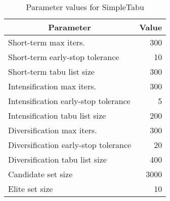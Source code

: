\begin{table}[htp]
\centering
\begin{tabular}{|l|r|}
    \hline
    \multicolumn{1}{|c|}{\textbf{Parameter}} & \multicolumn{1}{c|}{\textbf{Value}} \\ \hline
    Short-term max iters. & 300 \\ \hline
    Short-term early-stop tolerance & 10 \\ \hline
    Short-term tabu list size & 300 \\ \hline
    Intensification max iters. & 300 \\ \hline
    Intensification early-stop tolerance & 5 \\ \hline
    Intensification tabu list size & 200 \\ \hline
    Diversification max iters. & 300 \\ \hline
    Diversification early-stop tolerance & 20 \\ \hline
    Diversification tabu list size & 400 \\ \hline
    Candidate set size & 3000 \\ \hline
    Elite set size & 10 \\ \hline
\end{tabular}
\caption{Parameter values for SimpleTabu}
\label{tab:tabu-params}
\end{table}
